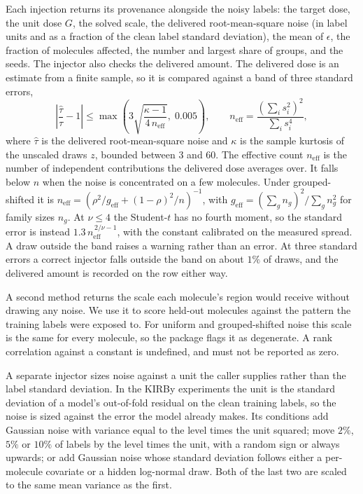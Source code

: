 Each injection returns its provenance alongside the noisy labels: the target dose, the unit dose
$G$, the solved scale, the delivered root-mean-square noise (in label units and as a fraction of the
clean label standard deviation), the mean of $\epsilon$, the fraction of molecules affected, the
number and largest share of groups, and the seeds. The injector also checks the delivered amount.
The delivered dose is an estimate from a finite sample, so it is compared against a band of three
standard errors,
\begin{equation}
\left|\frac{\hat{\tau}}{\tau} - 1\right| \le \max\!\left(3\sqrt{\frac{\kappa - 1}{4\,n_{\mathrm{eff}}}},\; 0.005\right),
\qquad
n_{\mathrm{eff}} = \frac{\left(\sum_i s_i^2\right)^2}{\sum_i s_i^4},
\label{eq:dose_tolerance}
\end{equation}
where $\hat{\tau}$ is the delivered root-mean-square noise and $\kappa$ is the sample kurtosis of the
unscaled draws $z$, bounded between 3 and 60. The effective count $n_{\mathrm{eff}}$ is the number of
independent contributions the delivered dose averages over. It falls below $n$ when the noise is
concentrated on a few molecules. Under grouped-shifted it is
$n_{\mathrm{eff}} = \left(\rho^2/g_{\mathrm{eff}} + (1-\rho)^2/n\right)^{-1}$, with
$g_{\mathrm{eff}} = \left(\sum_g n_g\right)^2 / \sum_g n_g^2$ for family sizes $n_g$. At
$\nu \le 4$ the Student-$t$ has no fourth moment, so the standard error is instead
$1.3\,n_{\mathrm{eff}}^{\,2/\nu - 1}$, with the constant calibrated on the measured spread. A draw
outside the band raises a warning rather than an error. At three standard errors a correct injector
falls outside the band on about $1\%$ of draws, and the delivered amount is recorded on the row
either way.

A second method returns the scale each molecule's region would receive without drawing any noise.
We use it to score held-out molecules against the pattern the training labels were exposed to. For
uniform and grouped-shifted noise this scale is the same for every molecule, so the package flags it
as degenerate. A rank correlation against a constant is undefined, and must not be reported as zero.

A separate injector sizes noise against a unit the caller supplies rather than the label standard
deviation. In the KIRBy experiments the unit is the standard deviation of a model's out-of-fold residual on
the clean training labels, so the noise is sized against the error the model already makes. Its
conditions add Gaussian noise with variance equal to the level times the unit squared; move $2\%$,
$5\%$ or $10\%$ of labels by the level times the unit, with a random sign or always upwards; or add
Gaussian noise whose standard deviation follows either a per-molecule covariate or a hidden
log-normal draw. Both of the last two are scaled to the same mean variance as the first.

